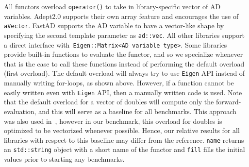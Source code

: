 All functors overload \verb|operator()| to take in library-specific vector of AD variables.
Adept2.0 supports their own array feature and encourages the use of \verb|aVector|.
FastAD supports the AD variable to have a vector-like shape by specifying the second template parameter as \verb|ad::vec|.
All other libraries support a direct interface with~\verb|Eigen::Matrix<AD variable type>|.
Some libraries provide built-in functions to evaluate the functor, and so we specialize whenever that is the case
to call these functions instead of performing the default overload (first overload).
The default overload will always try to use \verb|Eigen| API instead of manually writing for-loops, as shown above.
However, if a function cannot be easily written even with \verb|Eigen| API, then a manually written code is used.
Note that the default overload for a vector of doubles will compute only the forward-evaluation,
and this will serve as a baseline for all benchmarks.
This approach was also used in~\cite{carpenter:2015},
however in our benchmark, this overload for doubles is optimized to be vectorized whenever possible.
Hence, our relative results for all libraries with respect to this baseline may differ from the reference.
\verb|name| returns an \verb|std::string| object with a short name of the functor
and \verb|fill| fills the initial values prior to starting any benchmarks. 

